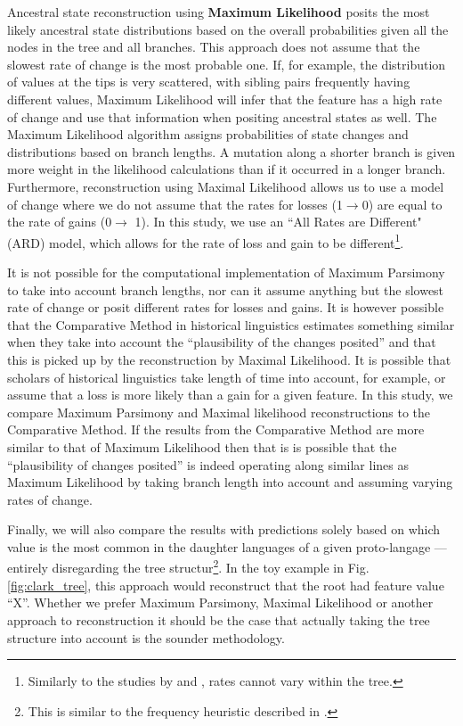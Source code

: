 \documentclass[a4paper,10pt]{article} %
\begin{document}
Ancestral state reconstruction using \textbf{Maximum Likelihood} posits the most likely ancestral state distributions based on the overall probabilities given all the nodes in the tree and all branches. This approach does not assume that the slowest rate of change is the most probable one. If, for example, the distribution of values at the tips is very scattered, with sibling pairs frequently having different values, Maximum Likelihood will infer that the feature has a high rate of change and use that information when positing ancestral states as well. The Maximum Likelihood algorithm assigns probabilities of state changes and distributions based on branch lengths. A mutation along a shorter branch is given more weight in the likelihood calculations than if it occurred in a longer branch. Furthermore, reconstruction using Maximal Likelihood allows us to use a model of change where we do not assume that the rates for losses (1$\rightarrow$0) are equal to the rate of gains (0$\rightarrow$ 1). In this study, we use an ``All Rates are Different" (ARD) model, which allows for the rate of loss and gain to be different\footnote{
Similarly to the studies by \citet{carling2021reconstructing} and \citet{goldstein_2022}, rates cannot vary within the tree.}. 

It is not possible for the computational implementation of Maximum Parsimony to take into account branch lengths, nor can it assume anything but the slowest rate of change or posit different rates for losses and gains. It is however possible that the Comparative Method in historical linguistics estimates something similar when they take into account the ``plausibility of the changes posited'' and that this is picked up by the reconstruction by Maximal Likelihood. It is possible that scholars of historical linguistics take length of time into account, for example, or assume that a loss is more likely than a gain for a given feature. In this study, we compare Maximum Parsimony and Maximal likelihood reconstructions to the Comparative Method. If the results from the Comparative Method are more similar to that of Maximum Likelihood then that is is possible that the ``plausibility of changes posited'' is indeed operating along similar lines as Maximum Likelihood by taking branch length into account and assuming varying rates of change.

Finally, we will also compare the results with predictions solely based on which value is the most common in the daughter languages of a given proto-langage --- entirely disregarding the tree structur\footnote{This is similar to the frequency heuristic described in \citet{goldstein_2022}.}. In the toy example in Fig. \ref{fig:clark_tree}, this approach would reconstruct that the root had feature value ``X''. Whether we prefer Maximum Parsimony, Maximal Likelihood or another approach to reconstruction it should be the case that actually taking the tree structure into account is the sounder methodology. %
\end{document}
